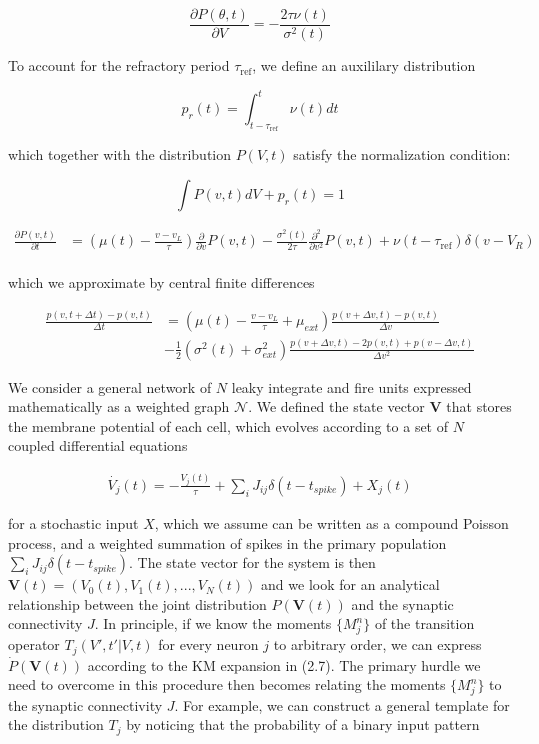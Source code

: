 \documentclass{ucetd}
\begin{document}
\begin{equation*}
\frac{\partial P(\theta,t)}{\partial V} = -\frac{2\tau\nu(t)}{\sigma^{2}(t)}
\end{equation*}

To account for the refractory period $\tau_{\mathrm{ref}}$, we define an auxililary distribution

\begin{equation*}
p_{r}(t) = \int_{t-\tau_{\mathrm{ref}}}^{t} \nu(t)dt
\end{equation*}

which together with the distribution $P(V,t)$ satisfy the normalization condition:

\begin{equation*}
\int P(v,t)dV + p_{r}(t) = 1
\end{equation*}

\begin{align*}
\frac{\partial P(v,t)}{\partial t} &= \left(\mu(t) - \frac{v-v_{L}}{\tau}\right) \frac{\partial}{\partial v} P(v,t) - \frac{\sigma^{2}(t)}{2\tau}\frac{\partial^{2}}{\partial v^{2}} P(v,t) + \nu(t-\tau_{\mathrm{ref}})\delta(v-V_{R})\\
\end{align*} 


which we approximate by central finite differences

\begin{align*}
\frac{p(v, t+\Delta t) - p(v,t)}{\Delta t} &= \left(\mu(t) - \frac{v-v_{L}}{\tau}+ \mu_{ext}\right)\frac{p(v+\Delta v, t) - p(v,t)}{\Delta v} \\
&- \frac{1}{2}\left(\sigma^{2}(t) + \sigma_{ext}^{2}\right)\frac{p(v+\Delta v, t) - 2p(v,t) + p(v-\Delta v, t)}{\Delta v^{2}}
\end{align*} 

We consider a general network of $N$ leaky integrate and fire units expressed mathematically as a weighted graph $\mathcal{N}$. We defined the state vector $\mathbf{V}$ that stores the membrane potential of each cell, which evolves according to a set of $N$ coupled differential equations

\begin{align*}
\dot{V_{j}}(t) = -\frac{V_{j}(t)}{\tau} + \sum_{i}J_{ij}\delta(t-t_{spike}) + X_{j}(t)
\end{align*}

for a stochastic input $X$, which we assume can be written as a compound Poisson process, and a weighted summation of spikes in the primary population $\sum_{i}J_{ij}\delta(t-t_{spike})$. The state vector for the system is then $\mathbf{V}(t) = (V_{0}(t), V_{1}(t), ..., V_{N}(t))$ and we look for an analytical relationship between the joint distribution $P(\mathbf{V}(t))$ and the synaptic connectivity $J$. In principle, if we know the moments $\{M_{j}^{n}\}$  of the transition operator $T_{j}(V',t'|V,t)$ for every neuron $j$ to arbitrary order, we can express $\dot{P}(\mathbf{V}(t))$ according to the KM expansion in (2.7). The primary hurdle we need to overcome in this procedure then becomes relating the moments $\{M_{j}^{n}\}$ to the synaptic connectivity $J$. For example, we can construct a general template for the distribution $T_{j}$ by noticing that the probability of a binary input pattern
\end{document}
